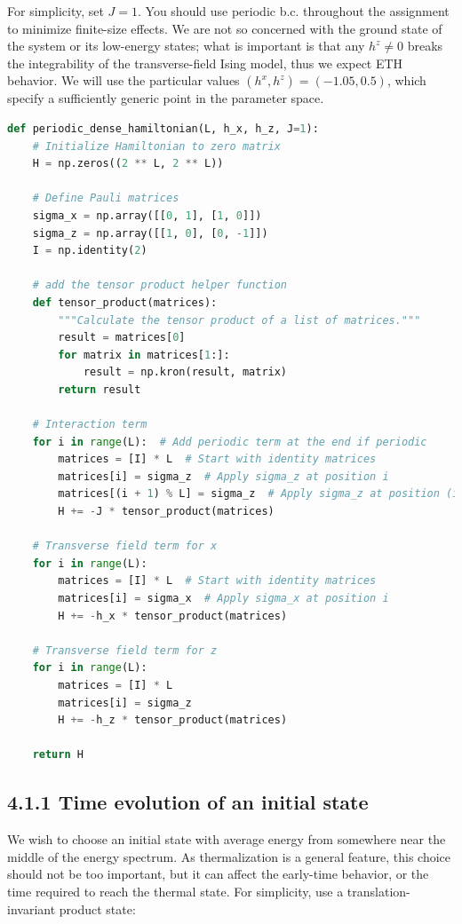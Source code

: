 \documentclass[12pt]{article}
\begin{document}
For simplicity, set $J=1$. You should use periodic b.c. throughout the assignment to minimize finite-size effects. We are not so concerned with the ground state of the system or its low-energy states; what is important is that any $h^{z} \neq 0$ breaks the integrability of the transverse-field Ising model, thus we expect ETH behavior. We will use the particular values $\left(h^{x}, h^{z}\right)=(-1.05,0.5)$, which specify a sufficiently generic point in the parameter space.

\begin{lstlisting}[language=Python]
def periodic_dense_hamiltonian(L, h_x, h_z, J=1):
    # Initialize Hamiltonian to zero matrix
    H = np.zeros((2 ** L, 2 ** L))

    # Define Pauli matrices
    sigma_x = np.array([[0, 1], [1, 0]])
    sigma_z = np.array([[1, 0], [0, -1]])
    I = np.identity(2)

    # add the tensor product helper function
    def tensor_product(matrices):
        """Calculate the tensor product of a list of matrices."""
        result = matrices[0]
        for matrix in matrices[1:]:
            result = np.kron(result, matrix)
        return result
    
    # Interaction term
    for i in range(L):  # Add periodic term at the end if periodic
        matrices = [I] * L  # Start with identity matrices
        matrices[i] = sigma_z  # Apply sigma_z at position i
        matrices[(i + 1) % L] = sigma_z  # Apply sigma_z at position (i+1) modulo L for periodic
        H += -J * tensor_product(matrices)

    # Transverse field term for x
    for i in range(L):
        matrices = [I] * L  # Start with identity matrices
        matrices[i] = sigma_x  # Apply sigma_x at position i
        H += -h_x * tensor_product(matrices)

    # Transverse field term for z
    for i in range(L):
        matrices = [I] * L
        matrices[i] = sigma_z
        H += -h_z * tensor_product(matrices)

    return H
\end{lstlisting}

\subsection*{4.1.1 Time evolution of an initial state}
We wish to choose an initial state with average energy from somewhere near the middle of the energy spectrum. As thermalization is a general feature, this choice should not be too important, but it can affect the early-time behavior, or the time required to reach the thermal state. For simplicity, use a translation-invariant product state:
\end{document}
